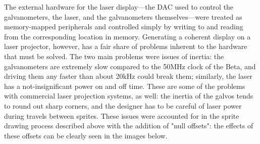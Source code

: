 \documentclass{article}
\begin{document}
The external hardware for the laser display—the DAC used to control the galvanometers, the laser, and the galvanometers themselves—were treated as memory-mapped peripherals and controlled simply by writing to and reading from the corresponding location in memory. Generating a coherent display on a laser projector, however, has a fair share of problems inherent to the hardware that must be solved. The two main problems were issues of inertia: the galvanometers are extremely slow compared to the 50MHz clock of the Beta, and driving them any faster than about 20kHz could break them; similarly, the laser has a not-insignificant power on and off time. These are some of the problems with commercial laser projection systems, as well: the inertia of the galvos tends to round out sharp corners, and the designer has to be careful of laser power during travels between sprites. These issues were accounted for in the sprite drawing process described above with the addition of "null offsets": the effects of these offsets can be clearly seen in the images below.
\end{document}
